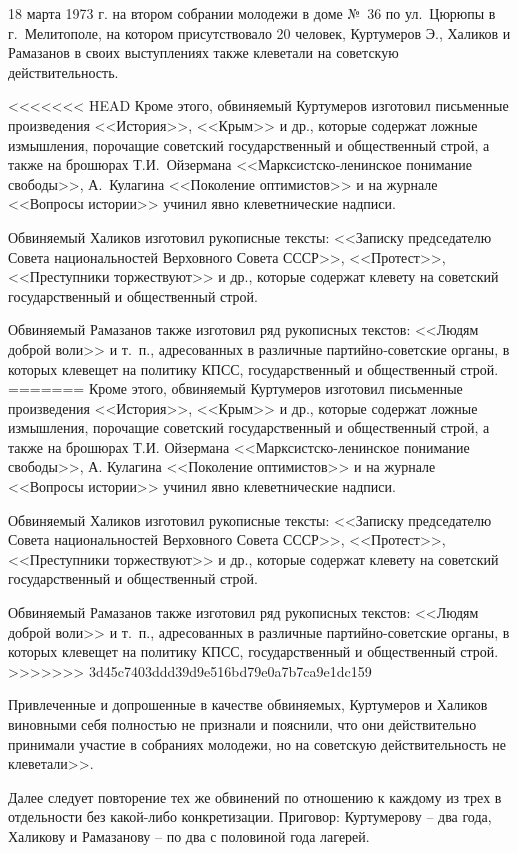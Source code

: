 \documentclass{book}
\begin{document}
18 марта 1973 г. на втором собрании молодежи в доме №~36 по ул.~Цюрюпы в г.~Мелитополе, на котором присутствовало 20 человек, Куртумеров Э., Халиков и Рамазанов в своих выступлениях также клеветали на советскую действительность.

<<<<<<< HEAD
Кроме этого, обвиняемый Куртумеров изготовил письменные произведения <<История>>, <<Крым>> и др., которые содер­жат ложные измышления, порочащие советский государственный и общественный строй, а также на брошюрах Т.И.~Ойзермана <<Марксистско‑ленинское понимание свободы>>, А.~Кулагина <<Поколение оптимистов>> и на журнале <<Вопросы истории>> учинил явно клеветнические надписи.

Обвиняемый Халиков изготовил рукописные тексты: <<Записку председателю Совета национальностей Верховного Совета СССР>>, <<Протест>>, <<Преступники торжествуют>> и др., которые содержат клевету на советский государственный и общественный строй.

Обвиняемый Рамазанов также изготовил ряд рукописных текстов: <<Людям доброй воли>> и т.~п., адресованных в различные партийно‑советские органы, в которых клевещет на поли­тику КПСС, государственный и общественный строй.
=======
Кроме этого, обвиняемый Куртумеров изготовил письменные произведения <<История>>, <<Крым>> и др., которые содер­жат ложные измышления, порочащие советский государственный и общественный строй, а также на брошюрах Т.И. Ойзермана <<Марксистско-ленинское понимание свободы>>, А. Кулагина <<Поколение оптимистов>> и на журнале <<Вопросы истории>> учинил явно клеветнические надписи.

Обвиняемый Халиков изготовил рукописные тексты: <<Записку председателю Совета национальностей Верховного Совета СССР>>, <<Протест>>, <<Преступники торжествуют>> и др., которые содержат клевету на советский государственный и общественный строй.

Обвиняемый Рамазанов также изготовил ряд рукописных текстов: <<Людям доброй воли>> и т.~п., адресованных в различные партийно-советские органы, в которых клевещет на поли­тику КПСС, государственный и общественный строй.
>>>>>>> 3d45c7403ddd39d9e516bd79e0a7b7ca9e1dc159

Привлеченные и допрошенные в качестве обвиняемых, Куртумеров и Халиков виновными себя полностью не признали и пояснили, что они действительно принимали участие в собраниях молодежи, но на советскую действительность не клеветали>>.

Далее следует повторение тех же обвинений по отношению к каждому из трех в отдельности без какой-либо конкретизации. Приговор: Куртумерову -- два года, Халикову и Рамазанову -- по два с половиной года лагерей.
\end{document}
